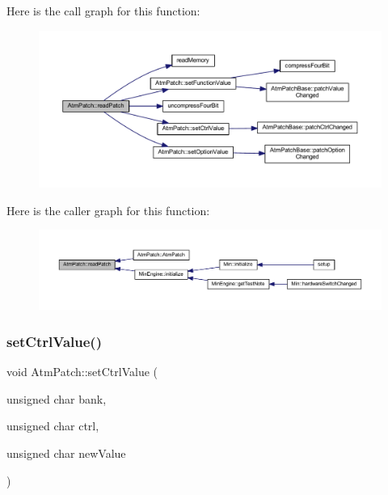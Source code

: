 Here is the call graph for this function\+:
\nopagebreak
\begin{figure}[H]
\begin{center}
\leavevmode
\includegraphics[width=350pt]{class_atm_patch_a9689db39f28d3c7d0fcaa6966c82e2d6_cgraph}
\end{center}
\end{figure}
Here is the caller graph for this function\+:
\nopagebreak
\begin{figure}[H]
\begin{center}
\leavevmode
\includegraphics[width=350pt]{class_atm_patch_a9689db39f28d3c7d0fcaa6966c82e2d6_icgraph}
\end{center}
\end{figure}
\mbox{\label{class_atm_patch_a95fb3ea0dfd3369abe7518da26edb1b5}} 
\subsubsection{\texorpdfstring{set\+Ctrl\+Value()}{setCtrlValue()}}
{\footnotesize\ttfamily void Atm\+Patch\+::set\+Ctrl\+Value (\begin{DoxyParamCaption}\item[{unsigned char}]{bank,  }\item[{unsigned char}]{ctrl,  }\item[{unsigned char}]{new\+Value }\end{DoxyParamCaption})}



